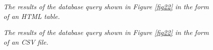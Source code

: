 \documentclass[10pt,journal,compsoc]{IEEEtran}
\begin{document}
\begin{figure}[!t]
\centering
{}
\caption{\textit{The results of the database query shown in Figure \ref{fig22} in the form of an HTML table.}}
\label{fig23}
\caption{\textit{The results of the database query shown in Figure \ref{fig22} in the form of an CSV file.}}
\label{fig24}
\end{figure}
\end{document}
